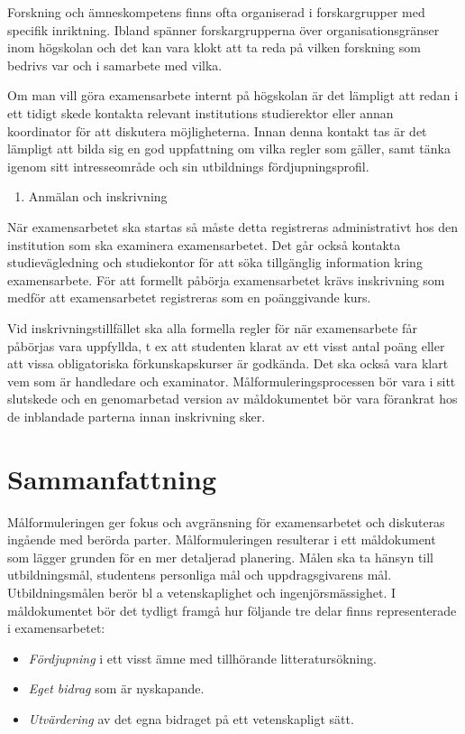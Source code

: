 Forskning och ämneskompetens finns ofta organiserad i forskargrupper med
specifik inriktning. Ibland spänner forskargrupperna över
organisationsgränser inom högskolan och det kan vara klokt att ta reda
på vilken forskning som bedrivs var och i samarbete med vilka.

Om man vill göra examensarbete internt på högskolan är det lämpligt att
redan i ett tidigt skede kontakta relevant institutions studierektor
eller annan koordinator för att diskutera möjligheterna. Innan denna
kontakt tas är det lämpligt att bilda sig en god uppfattning om vilka
regler som gäller, samt tänka igenom sitt intresseområde och sin
utbildnings fördjupningsprofil.

\begin{enumerate}
\def\labelenumi{\arabic{enumi}.}
\item
  Anmälan och inskrivning
\end{enumerate}

När examensarbetet ska startas så måste detta registreras administrativt
hos den institution som ska examinera examensarbetet. Det går också
kontakta studievägledning och studiekontor för att söka tillgänglig
information kring examensarbete. För att formellt påbörja examensarbetet
krävs inskrivning som medför att examensarbetet registreras som en
poänggivande kurs.

Vid inskrivningstillfället ska alla formella regler för när
examensarbete får påbörjas vara uppfyllda, t ex att studenten klarat av
ett visst antal poäng eller att vissa obligatoriska förkunskapskurser är
godkända. Det ska också vara klart vem som är handledare och examinator.
Målformuleringsprocessen bör vara i sitt slutskede och en genomarbetad
version av måldokumentet bör vara förankrat hos de inblandade parterna
innan inskrivning sker.

\section{Sammanfattning}\label{sammanfattning}

Målformuleringen ger fokus och avgränsning för examensarbetet och
diskuteras ingående med berörda parter. Målformuleringen resulterar i
ett måldokument som lägger grunden för en mer detaljerad planering.
Målen ska ta hänsyn till utbildningsmål, studentens personliga mål och
uppdragsgivarens mål. Utbildningsmålen berör bl a vetenskaplighet och
ingenjörsmässighet. I måldokumentet bör det tydligt framgå hur följande
tre delar finns representerade i examensarbetet:

\begin{itemize}
\item
  \emph{Fördjupning} i ett visst ämne med tillhörande litteratursökning.
\item
  \emph{Eget bidrag} som är nyskapande.
\item
  \emph{Utvärdering} av det egna bidraget på ett vetenskapligt sätt.
\end{itemize}
